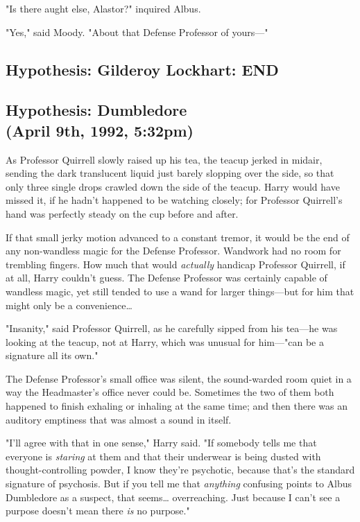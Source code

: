 "Is there aught else, Alastor?" inquired Albus.

"Yes," said Moody. "About that Defense Professor of yours---"

\sbreak

\subsection{Hypothesis: Gilderoy Lockhart: END}

\sbreakit

\subsection{Hypothesis: Dumbledore\\
(April 9th, 1992, 5:32pm)}

As Professor Quirrell slowly raised up his tea, the teacup jerked in midair, 
sending the dark translucent liquid just barely slopping over the side, so that 
only three single drops crawled down the side of the teacup. Harry would have 
missed it, if he hadn't happened to be watching closely; for Professor 
Quirrell's hand was perfectly steady on the cup before and after.

If that small jerky motion advanced to a constant tremor, it would be the end 
of any non-wandless magic for the Defense Professor. Wandwork had no room for 
trembling fingers. How much that would \emph{actually} handicap Professor 
Quirrell, if at all, Harry couldn't guess. The Defense Professor was certainly 
capable of wandless magic, yet still tended to use a wand for larger 
things---but for him that might only be a convenience{\ldots}

"Insanity," said Professor Quirrell, as he carefully sipped from his tea---he 
was looking at the teacup, not at Harry, which was unusual for him---"can be a 
signature all its own."

The Defense Professor's small office was silent, the sound-warded room quiet in 
a way the Headmaster's office never could be. Sometimes the two of them both 
happened to finish exhaling or inhaling at the same time; and then there was an 
auditory emptiness that was almost a sound in itself.

"I'll agree with that in one sense," Harry said. "If somebody tells me that 
everyone is \emph{staring} at them and that their underwear is being dusted 
with thought-controlling powder, I know they're psychotic, because that's the 
standard signature of psychosis. But if you tell me that \emph{anything} 
confusing points to Albus Dumbledore as a suspect, that seems{\ldots} 
overreaching. Just because I can't see a purpose doesn't mean there \emph{is} 
no purpose."

